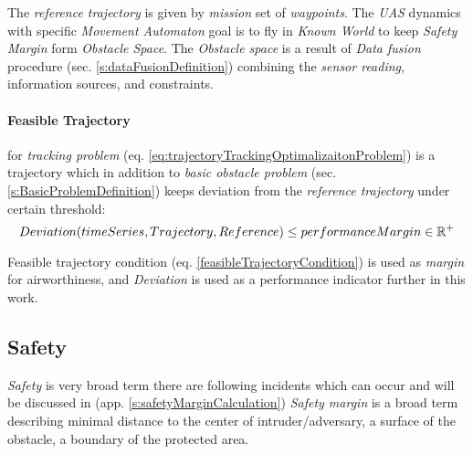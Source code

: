 The \emph{reference trajectory} is given by \emph{mission} set of \emph{waypoints}. The \emph{UAS} dynamics with specific \emph{Movement Automaton} goal is to fly in \emph{Known World} to keep \emph{Safety Margin} form  \emph{Obstacle Space}. The \emph{Obstacle space} is a result of \emph{Data fusion} procedure (sec. \ref{s:dataFusionDefinition}) combining the \emph{sensor reading}, information sources, and constraints.

\paragraph{Feasible Trajectory} for \emph{tracking problem} (eq. \ref{eq:trajectoryTrackingOptimalizaitonProblem}) is a trajectory which in addition to \emph{basic obstacle problem} (sec. \ref{s:BasicProblemDefinition}) keeps deviation from the \emph{reference trajectory} under certain threshold:
\begin{equation}\label{feasibleTrajectoryCondition}
    Deviation(timeSeries, Trajectory, Reference) \le performanceMargin \in \mathbb{R}^+
\end{equation}

Feasible trajectory condition (eq. \ref{feasibleTrajectoryCondition}) is used as \emph{margin} for airworthiness, and \emph{Deviation} is used as a performance indicator further in this work.


\subsection{Safety}\label{s:Safety}
\noindent \emph{Safety} is very broad term there are following incidents which can occur and will be discussed in (app. \ref{s:safetyMarginCalculation}) \emph{Safety margin} is a broad term describing minimal distance to the center of intruder/adversary, a surface of the obstacle, a boundary of the protected area.

